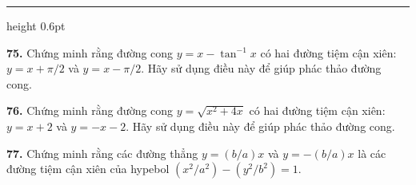 \documentclass[10pt]{article}
\begin{document}
\begin{minipage}[t]{0.485\textwidth}
  \vspace{4pt}
  {\color{rulecolor}\hrule height 0.6pt}
  \vspace{3pt}

  \textbf{75.} Chứng minh rằng đường cong $y = x - \tan^{-1}x$ có hai đường tiệm cận xiên: $y = x + \pi/2$ và $y = x - \pi/2$. Hãy sử dụng điều này để giúp phác thảo đường cong.

  \textbf{76.} Chứng minh rằng đường cong $y = \sqrt{x^2+4x}$ có hai đường tiệm cận xiên: $y = x + 2$ và $y = -x - 2$. Hãy sử dụng điều này để giúp phác thảo đường cong.

  \textbf{77.} Chứng minh rằng các đường thẳng $y = (b/a)x$ và $y = -(b/a)x$ là các đường tiệm cận xiên của hypebol $(x^2/a^2) - (y^2/b^2) = 1$.
\end{minipage}
\end{document}
